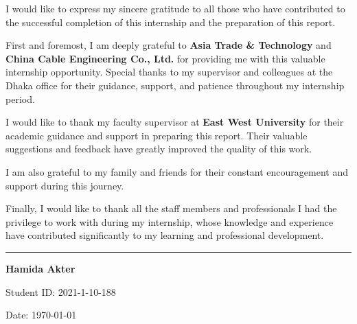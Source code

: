\vspace{0.5cm}
\begin{minipage}{0.9\textwidth}
    \large
    I would like to express my sincere gratitude to all those who have contributed to the successful completion of this internship and the preparation of this report.
    
    \vspace{0.5cm}
    First and foremost, I am deeply grateful to \textbf{Asia Trade \& Technology} and \textbf{China Cable Engineering Co., Ltd.} for providing me with this valuable internship opportunity. Special thanks to my supervisor and colleagues at the Dhaka office for their guidance, support, and patience throughout my internship period.
    
    \vspace{0.5cm}
    I would like to thank my faculty supervisor at \textbf{East West University} for their academic guidance and support in preparing this report. Their valuable suggestions and feedback have greatly improved the quality of this work.
    
    \vspace{0.5cm}
    I am also grateful to my family and friends for their constant encouragement and support during this journey.
    
    \vspace{0.5cm}
    Finally, I would like to thank all the staff members and professionals I had the privilege to work with during my internship, whose knowledge and experience have contributed significantly to my learning and professional development.
    
    \vspace{1cm}
    \begin{minipage}{0.4\textwidth}
        \centering
        \rule{6cm}{0.5pt}
        
        \vspace{0.3cm}
        \textbf{Hamida Akter}
        
        \vspace{0.2cm}
        Student ID: 2021-1-10-188
        
        \vspace{0.2cm}
        Date: \today
    \end{minipage}
\end{minipage}
\par\endgroup

\newpage
\thispagestyle{empty}
\begingroup
\centering

